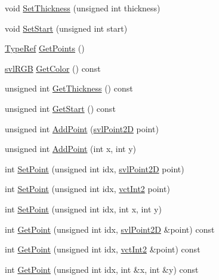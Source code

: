 \begin{DoxyCompactItemize}
\item 
void \hyperlink{classsvl_overlay_static_poly_a17ed37cc56d58040d1d12c0fe85e94ae}{Set\-Thickness} (unsigned int thickness)
\item 
void \hyperlink{classsvl_overlay_static_poly_ae8ae725ac8c1e75d6a3e3ace3c9004a5}{Set\-Start} (unsigned int start)
\item 
\hyperlink{classsvl_overlay_static_poly_a2d317856c0cec72b3a76252446a85944}{Type\-Ref} \hyperlink{classsvl_overlay_static_poly_a2c472b602380bb58381f46cd29f63560}{Get\-Points} ()
\item 
\hyperlink{structsvl_r_g_b}{svl\-R\-G\-B} \hyperlink{classsvl_overlay_static_poly_a17e72ba1edf6899cd9fb50003096dfed}{Get\-Color} () const 
\item 
unsigned int \hyperlink{classsvl_overlay_static_poly_ab31338f864db98e07bbc2a112a646f1e}{Get\-Thickness} () const 
\item 
unsigned int \hyperlink{classsvl_overlay_static_poly_a372b4710b5f097e2d329799edaa404be}{Get\-Start} () const 
\item 
unsigned int \hyperlink{classsvl_overlay_static_poly_a39fdc3924a9b3cf2ff4a624cfa5e734e}{Add\-Point} (\hyperlink{structsvl_point2_d}{svl\-Point2\-D} point)
\item 
unsigned int \hyperlink{classsvl_overlay_static_poly_af9f62fde7c3bd1722ad13ba6d603fe25}{Add\-Point} (int x, int y)
\item 
int \hyperlink{classsvl_overlay_static_poly_aea5063322c51e650423148cbb44bc646}{Set\-Point} (unsigned int idx, \hyperlink{structsvl_point2_d}{svl\-Point2\-D} point)
\item 
int \hyperlink{classsvl_overlay_static_poly_ada71c95d74bf8d811cad2c6bf7f107f6}{Set\-Point} (unsigned int idx, \hyperlink{vct_fixed_size_vector_types_8h_add8c88eb6a432b15f14b866b9c35325f}{vct\-Int2} point)
\item 
int \hyperlink{classsvl_overlay_static_poly_a2a908bda90c76d762df2444dd7ba7b36}{Set\-Point} (unsigned int idx, int x, int y)
\item 
int \hyperlink{classsvl_overlay_static_poly_a1366411fffae2fec8f98c3740d8e64cf}{Get\-Point} (unsigned int idx, \hyperlink{structsvl_point2_d}{svl\-Point2\-D} \&point) const 
\item 
int \hyperlink{classsvl_overlay_static_poly_a38888e6f59acab87848db8f4c5e3efd0}{Get\-Point} (unsigned int idx, \hyperlink{vct_fixed_size_vector_types_8h_add8c88eb6a432b15f14b866b9c35325f}{vct\-Int2} \&point) const 
\item 
int \hyperlink{classsvl_overlay_static_poly_aaecd993bf9cac7c946db90bcc18b6e2e}{Get\-Point} (unsigned int idx, int \&x, int \&y) const 
\end{DoxyCompactItemize}
